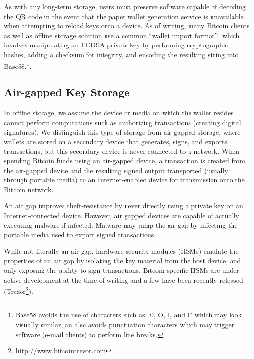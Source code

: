 
As with any long-term storage, users must preserve software capable of decoding the QR code in the event that the paper wallet generation service is unavailable when attempting to reload keys onto a device. As of writing, many Bitcoin clients as well as offline storage solution use a common ``wallet import format'', which involves manipulating an ECDSA private key by performing cryptographic hashes, adding a checksum for integrity, and encoding the resulting string into Base58.\footnote{Base58 avoids the use of characters such as ``0, O, I, and l'' which may look visually similar, an also avoids punctuation characters which may trigger software (\eg e-mail clients) to perform line breaks.}.

\subsection{Air-gapped Key Storage}
In offline storage, we assume the device or media on which the wallet resides cannot perform computations such as authorizing transactions (\ie creating digital signatures). We distinguish this type of storage from air-gapped storage, where wallets are stored on a secondary device that generates, signs, and exports transactions, but this secondary device is never connected to a network. When spending Bitcoin funds using an air-gapped device, a transaction is created from the air-gapped device and the resulting signed output transported (usually through portable media) to an Internet-enabled device for transmission onto the Bitcoin network. 

An air gap improves theft-resistance by never directly using a private key on an Internet-connected device. However, air gapped devices are capable of actually executing malware if infected. Malware may jump the air gap by infecting the portable media used to export signed transactions.

While not literally an air gap, hardware security modules (HSMs) emulate the properties of an air gap by isolating the key material from the host device, and only exposing the ability to sign transactions. Bitcoin-specific HSMs are under active development at the time of writing and a few have been recently released (\eg Trezor\footnote{\url{http://www.bitcointrezor.com}}).

